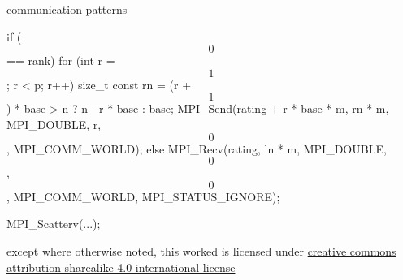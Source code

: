 \documentclass[10pt,t]{beamer}
\begin{document}
  \begin{frame}[fragile]{communication patterns}
    \begin{codeblock}
    if ($$0$$ == rank) {
      for (int r = $$1$$; r < p; r++) {
        size_t const rn = (r + $$1$$) * base > n
                        ? n - r * base : base;
        MPI_Send(rating + r * base * m, rn * m,
          MPI_DOUBLE, r, $$0$$, MPI_COMM_WORLD);
      }
    } else {
      MPI_Recv(rating, ln * m, MPI_DOUBLE, $$0$$, $$0$$,
        MPI_COMM_WORLD, MPI_STATUS_IGNORE);
    }
    \end{codeblock}

    \pause

    \begin{codeblock}
    MPI_Scatterv(...);
    \end{codeblock}
  \end{frame}

  \appendix

  \begin{frame}[c]
    \begin{center}\ccbysa\end{center}

    except where otherwise noted, this worked is licensed under
    \href{http://creativecommons.org/licenses/by-sa/4.0/}{creative commons
    attribution-sharealike 4.0 international license}
  \end{frame}
\end{document}
